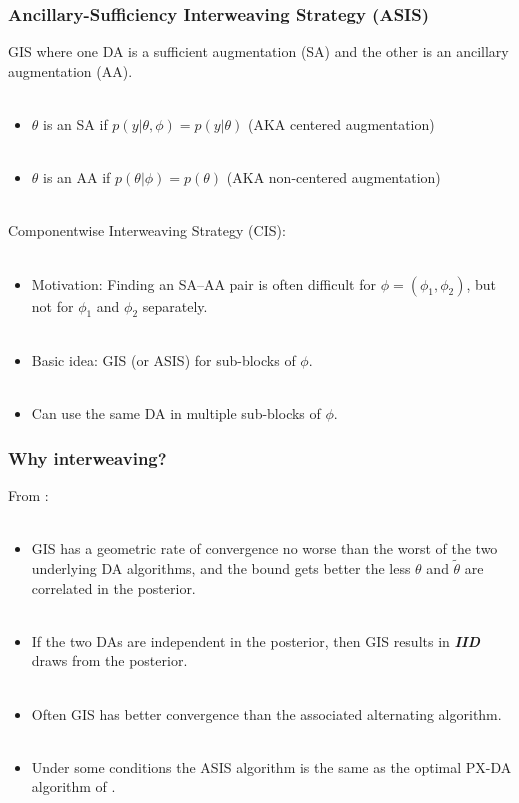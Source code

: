 \documentclass[xcolor=dvipsnames]{beamer}
\begin{document}
\begin{frame}
\frametitle{Ancillary-Sufficiency Interweaving Strategy (ASIS)}
GIS where one DA is a sufficient augmentation (SA) and the other is an ancillary augmentation (AA).\\~\\
\begin{itemize}
\item$\theta$ is an SA if $p(y|\theta,\phi)=p(y|\theta)$ (AKA centered augmentation)\\~\\
\item$\theta$ is an AA if $p(\theta|\phi)=p(\theta)$ (AKA non-centered augmentation)\\~\\
\end{itemize}
Componentwise Interweaving Strategy (CIS):\\~\\
\begin{itemize}
\item Motivation: Finding an SA--AA pair is often difficult for $\phi=(\phi_1,\phi_2)$, but not for $\phi_1$ and $\phi_2$ separately.\\~\\
\item Basic idea: GIS (or ASIS) for sub-blocks of $\phi$.\\~\\
\item Can use the same DA in multiple sub-blocks of $\phi$.
\end{itemize}
\end{frame}

\begin{frame}
\frametitle{Why interweaving?}
From \citet{yu2011center}:\\~\\
\begin{itemize}
  \item  GIS has a geometric rate of convergence no worse than the worst of the two underlying DA algorithms, and the bound gets better the less $\theta$ and $\tilde{\theta}$ are correlated in the posterior.\\~\\
  \item If the two DAs are independent in the posterior, then GIS results in {\color{blue}\textit{\textbf{IID}}} draws from the posterior. \\~\\
  \item Often GIS has better convergence than the associated alternating algorithm.\\~\\
  \item Under some conditions the ASIS algorithm is the same as the optimal PX-DA algorithm of \citet{liu1999parameter}.
  \end{itemize}
\end{frame}
\end{document}
